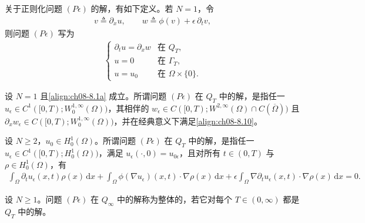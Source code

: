 \documentclass[../../main.tex]{subfiles}%
\begin{document}
关于正则化问题 $(P\epsilon)$ 的解，有如下定义。若 $N=1$，令
\begin{align}
v\triangleq \partial_x u,\qquad w\triangleq \phi(v)+\epsilon\,\partial_t v, \label{align:ch08-8.9}
\end{align}
则问题 $(P\epsilon)$ 写为
\begin{align}
\begin{cases}
\partial_t u=\partial_x w & \text{在 }Q_T,\\
u=0 & \text{在 }\Gamma_T,\\
u=u_0 & \text{在 }\Omega\times\{0\}.
\end{cases} \label{align:ch08-8.10}
\end{align}

\begin{definition}[$N=1$ 时 $(P\epsilon)$ 的解]\label{definition:ch08-正则化解N1}
设 $N=1$ 且\eqref{align:ch08-8.1a} 成立。所谓问题 $(P\epsilon)$ 在 $Q_T$ 中的解，是指任一 $u_\epsilon\in C^1([0,T);W^{1,\infty}_0(\Omega))$，其相伴的 $w_\epsilon\in C([0,T);W^{2,\infty}(\Omega)\cap C(\overline\Omega))$ 且 $\partial_x w_\epsilon\in C([0,T);W^{1,\infty}_0(\Omega))$，并在经典意义下满足\eqref{align:ch08-8.10}。
\end{definition}

\begin{definition}\label{definition:ch08-正则化解N2}
设 $N\geqslant2$，$u_0\in H^1_0(\Omega)$。所谓问题 $(P\epsilon)$ 在 $Q_T$ 中的解，是指任一 $u_\epsilon\in C^1([0,T);H^1_0(\Omega))$，满足 $u_\epsilon(\cdot,0)=u_{0\epsilon}$，且对所有 $t\in(0,T)$ 与 $\rho\in H^1_0(\Omega)$，有
\begin{align}
\int_\Omega\partial_t u_\epsilon(x,t)\rho(x)\,\mathrm{d}x
+\int_\Omega\phi(\nabla u_\epsilon)(x,t)\cdot\nabla\rho(x)\,\mathrm{d}x
+\epsilon\int_\Omega\nabla\partial_t u_\epsilon(x,t)\cdot\nabla\rho(x)\,\mathrm{d}x=0. \label{align:ch08-8.11}
\end{align}
\end{definition}

\begin{definition}[整体解]\label{definition:ch08-整体解}
设 $N\geqslant1$。问题 $(P\epsilon)$ 在 $Q_\infty$ 中的解称为整体的，若它对每个 $T\in(0,\infty)$ 都是 $Q_T$ 中的解。
\end{definition}
\end{document}
